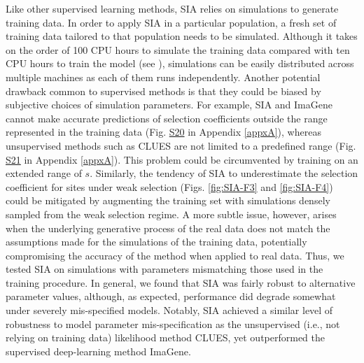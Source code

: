 Like other supervised learning methods, \ac{SIA} relies on simulations to generate training data. In order to apply \ac{SIA} in a particular population, a fresh set of training data tailored to that population needs to be simulated. Although it takes on the order of 100 CPU hours to simulate the training data compared with ten CPU hours to train the model (see ), simulations can be easily distributed across multiple machines as each of them runs independently. Another potential drawback common to supervised methods is that they could be biased by subjective choices of simulation parameters. For example, \ac{SIA} and ImaGene cannot make accurate predictions of selection coefficients outside the range represented in the training data (Fig. \href{https://academic.oup.com/mbe/article/39/1/msab332/6433161?login=true#supplementary-data}{S20} in Appendix \ref{appxA}), whereas unsupervised methods such as CLUES are not limited to a predefined range (Fig. \href{https://academic.oup.com/mbe/article/39/1/msab332/6433161?login=true#supplementary-data}{S21} in Appendix \ref{appxA}). This problem could be circumvented by training on an extended range of $s$. Similarly, the tendency of \ac{SIA} to underestimate the selection coefficient for sites under weak selection (Figs. \ref{fig:SIA-F3} and \ref{fig:SIA-F4}) could be mitigated by augmenting the training set with simulations densely sampled from the weak selection regime. A more subtle issue, however, arises when the underlying generative process of the real data does not match the assumptions made for the simulations of the training data, potentially compromising the accuracy of the method when applied to real data. Thus, we tested \ac{SIA} on simulations with parameters mismatching those used in the training procedure. In general, we found that \ac{SIA} was fairly robust to alternative parameter values, although, as expected, performance did degrade somewhat under severely mis-specified models. Notably, \ac{SIA} achieved a similar level of robustness to model parameter mis-specification as the unsupervised (i.e., not relying on training data) likelihood method CLUES, yet outperformed the supervised deep-learning method ImaGene.

